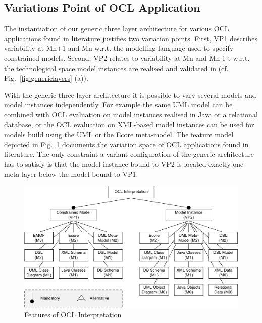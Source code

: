 \subsection{Variations Point of OCL Application}

The instantiation of our generic three layer architecture for various OCL
applications found in literature justifies 
two variation points. First, VP1 describes variability at Mn+1 and Mn
w.r.t. the modelling language used to specify constrained models. Second, VP2
relates to variability at Mn and Mn-1 t w.r.t. the technological space
model instances are realised and validated in (cf. Fig.~\ref{fig:genericlayers}
(a)). 

With the generic three layer architecture it is possible to vary several
models and model instances independently. For example the same UML model can be
combined with OCL evaluation on model instances realised in Java or a
relational database, or the OCL evaluation on XML-based model instances can be
used for models build using the UML or the Ecore meta-model. The feature model
depicted in Fig.~\ref{fig:features} documents the variation space of OCL
applications found in literature. The only constraint
a variant configuration of the generic architecture has to
satisfy is that the model instance bound to VP2 is located exactly one
meta-layer below the model bound to VP1. 

  \begin{figure}[t]
			\centering
		  \includegraphics[width=1.00\textwidth]{figures/features.pdf}
			\caption{Features of OCL Interpretation}
			\label{fig:features}
	\end{figure}
	
